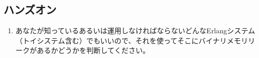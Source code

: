 \subsection*{ハンズオン}

\begin{enumerate}
  \item あなたが知っているあるいは運用しなければならないどんなErlangシステム（トイシステム含む）でもいいので、それを使ってそこにバイナリメモリリークがあるかどうかを判断してください。
\end{enumerate}
